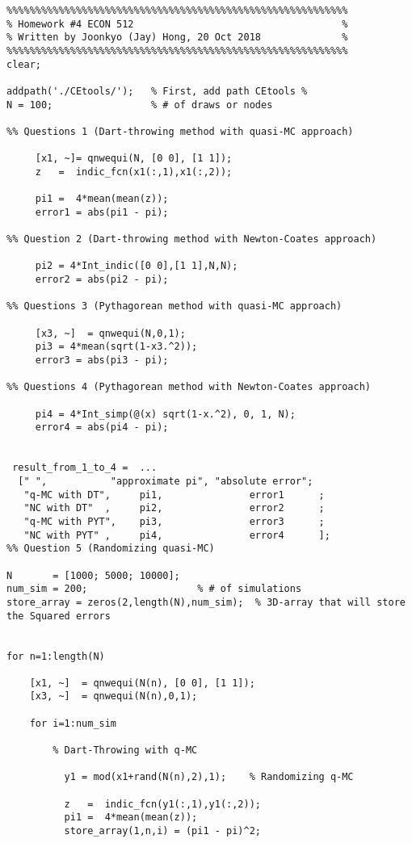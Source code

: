 \documentclass[10pt, letterpaper]{article}
\begin{document}
\begin{verbatim}
%%%%%%%%%%%%%%%%%%%%%%%%%%%%%%%%%%%%%%%%%%%%%%%%%%%%%%%%%%%
% Homework #4 ECON 512                                    %
% Written by Joonkyo (Jay) Hong, 20 Oct 2018              %
%%%%%%%%%%%%%%%%%%%%%%%%%%%%%%%%%%%%%%%%%%%%%%%%%%%%%%%%%%%
clear;

addpath('./CEtools/');   % First, add path CEtools %
N = 100;                 % # of draws or nodes 

%% Questions 1 (Dart-throwing method with quasi-MC approach)

     [x1, ~]= qnwequi(N, [0 0], [1 1]);
     z   =  indic_fcn(x1(:,1),x1(:,2));
     
     pi1 =  4*mean(mean(z));
     error1 = abs(pi1 - pi);
     
%% Question 2 (Dart-throwing method with Newton-Coates approach)
 
     pi2 = 4*Int_indic([0 0],[1 1],N,N);     
     error2 = abs(pi2 - pi);

%% Questions 3 (Pythagorean method with quasi-MC approach)

     [x3, ~]  = qnwequi(N,0,1);
     pi3 = 4*mean(sqrt(1-x3.^2));
     error3 = abs(pi3 - pi);
     
%% Questions 4 (Pythagorean method with Newton-Coates approach)

     pi4 = 4*Int_simp(@(x) sqrt(1-x.^2), 0, 1, N);
     error4 = abs(pi4 - pi);
     
     
 result_from_1_to_4 =  ...
  [" ",           "approximate pi", "absolute error";
   "q-MC with DT",     pi1,               error1      ;
   "NC with DT"  ,     pi2,               error2      ;
   "q-MC with PYT",    pi3,               error3      ;
   "NC with PYT" ,     pi4,               error4      ];
%% Question 5 (Randomizing quasi-MC)

N       = [1000; 5000; 10000]; 
num_sim = 200;                   % # of simulations
store_array = zeros(2,length(N),num_sim);  % 3D-array that will store the Squared errors


for n=1:length(N)   
            
    [x1, ~]  = qnwequi(N(n), [0 0], [1 1]);
    [x3, ~]  = qnwequi(N(n),0,1);

    for i=1:num_sim
        
        % Dart-Throwing with q-MC
        
          y1 = mod(x1+rand(N(n),2),1);    % Randomizing q-MC 
         
          z   =  indic_fcn(y1(:,1),y1(:,2));
          pi1 =  4*mean(mean(z));
          store_array(1,n,i) = (pi1 - pi)^2;        
                    

\end{verbatim}
\end{document}
